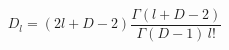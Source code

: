 \begin{equation}
D_{l}=(2l+D-2)\frac{\Gamma (l+D-2)}{\Gamma (D-1)\,l!}
\label{Dlang}
\end{equation}

